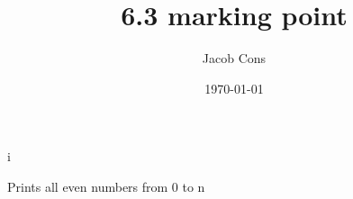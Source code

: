 \documentclass[12pt]{article}
\title{6.3 marking point}
\author{Jacob Cons}
\date{\today}
\begin{document}
\maketitle

\begin{algorithm}
    \begin{algorithmic}
            \PRINT i
        \ENDFOR
    \end{algorithmic}
    \caption{Prints all even numbers from 0 to n}
    \label{printEvenNumbers}
\end{algorithm}
\end{document}
